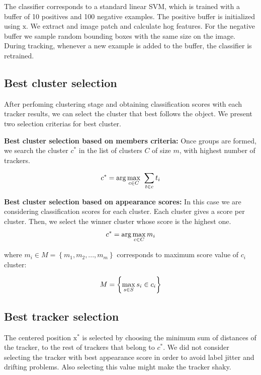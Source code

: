 The classifier corresponds to a standard linear SVM, which is trained with a buffer of 10 positives and 100 negative examples. The positive buffer is initialized using $\mathrm{x}$. We extract and image patch and calculate hog features. For the negative buffer we sample random bounding boxes with the same size on the image. During tracking, whenever a new example is added to the buffer, the classifier is retrained.


\subsection{Best cluster selection}

After perfoming clustering stage and obtaining classification scores with each tracker results, we can select the cluster that best follows the object. We present two selection criterias for best cluster.

\textbf{Best cluster selection based on members criteria:} Once groups are formed, we search the cluster $c^{*}$ in the list of clusters $C$ of size $m$, with highest number of trackers.

\begin{equation}
\large
c^{*} = \arg\max_{c\in C} ~\sum_{t \in c}t_{i} 
\end{equation}

\textbf{Best cluster selection based on appearance scores:} In this case we are considering classification scores for each cluster. Each cluster gives a score per cluster. Then, we select the winner cluster whose score is the highest one. 
\begin{equation}
\large
c^{*} = \arg\max_{c\in C} m_{i}
\end{equation}

where $m_i \in M = \left \{ m_1, m_2, ..., m_m \right \}$ corresponds to maximum score value of $c_i$ cluster:

\begin{equation}
\large
M =  \left \{ \max_{s\in S} s_i \in c_i \right \}
\end{equation}


\subsection{Best tracker selection}

The centered position $\mathrm{x}^{*}$ is selected by choosing the minimum sum of distances of the tracker, to the rest of trackers that belong to $c^{*}$. We did not consider selecting the tracker with best appearance score in order to avoid label jitter and drifting problems. Also selecting this value might make the tracker shaky.

